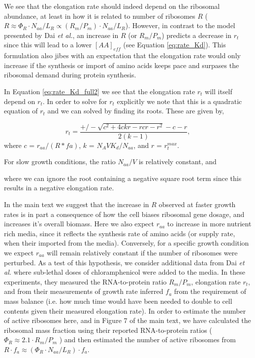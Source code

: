 We see that the elongation rate should indeed depend on the ribosomal abundance,
at least in how it is related to number of ribosomes $R$ ($R \approx \Phi_R
\cdot N_{aa}/ L_R \propto (R_m/P_m) \cdot N_{aa}/ L_R$). However, in contrast to
the model presented by Dai \textit{et al.}, an increase in $R$ (or $R_m/P_m$)
predicts a decrease in $r_t$ since this will lead to a lower $[AA]_{eff}$ (see
Equation \ref{eq:rate_Kd}). This formulation also jibes with an expectation that
the elongation rate would only increase if the synthesis or import of amino
acids keeps pace and surpases the ribosomal demand during protein synthesis.

In Equation \ref{eq:rate_Kd_full2} we see that the elongation rate $r_t$ will
itself depend on $r_t$. In order to solve for $r_t$ explicitly we note that this
is a quadratic equation of $r_t$ and we can solved by finding its roots. These
are given by,

\begin{equation}
r_t = \frac{+/- \sqrt{c^2 + 4 c k r - r cr - r^2} - c - r}{2 (k - 1)},
\label{eq:rt_roots}
\end{equation}
where $c$ = $r_{aa}/ (R*fa)$, $k$ = $N_A V K_d/N_{aa}$, and $r$ = $r_t^{max}$.

For slow growth conditions, the ratio
$N_{aa}/V$ is relatively constant, and


where we can ignore the root containing a negative square root term since this
results in a negative elongation rate.

In the main text we suggest that the increase in $R$ observed at faster growth
rates is in part a consequence of how the cell biases ribosomal gene dosage, and
increases it's overall biomass. Here we also expect $r_{aa}$ to increase in more
nutrient rich media, since it reflects the synthesis rate of amino acids (or
supply rate, when their imported from the media). Conversely, for a specific
growth condition we expect $r_{aa}$ will remain relatively constant if the
number of ribosomes were perturbed. As a test of this hypothesis, we consider
additional data from Dai \textit{et al.} where sub-lethal doses of
chloramphenicol were added to the media. In these experiments,  they measured
the RNA-to-protein ratio $R_m/P_m$, elongation rate $r_t$, and from their
measurements of growth rate inferred $f_a$ from the requirement of mass balance
(i.e. how  much time would have been needed to double to cell contents given
their measured elongation rate). In order to estimate the number of active
ribosomes here, and in Figure 7 of the main text, we have calculated the
ribosomal mass fraction using their reported RNA-to-protein ratios ($\Phi_R
\approx 2.1 \cdot R_m/P_m$ \cite{dai2016}) and then estimated the number of
active ribosomes from $R \cdot f_a \approx (\Phi_R \cdot N_{aa}/ L_R) \cdot
f_a$.

